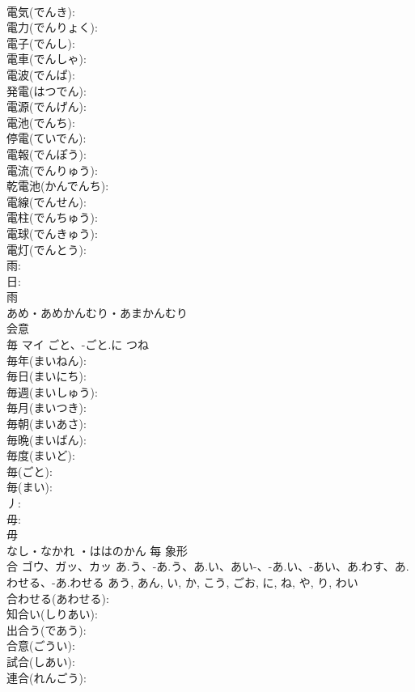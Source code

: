 \documentclass[8pt]{extreport}
\begin{document}
\begin{CJK}{UTF8}{min}
\\	電気(でんき): 
\\	電力(でんりょく): 
\\	電子(でんし): 
\\	電車(でんしゃ): 
\\	電波(でんぱ): 
\\	発電(はつでん): 
\\	電源(でんげん): 
\\	電池(でんち): 
\\	停電(ていでん): 
\\	電報(でんぽう): 
\\	電流(でんりゅう): 
\\	乾電池(かんでんち): 
\\	電線(でんせん): 
\\	電柱(でんちゅう): 
\\	電球(でんきゅう): 
\\	電灯(でんとう): 
\\	雨: 
\\	日: 
\\	雨	
\\	あめ・あめかんむり・あまかんむり	
\\	会意 
\\	毎	マイ	ごと、-ごと.に	つね	
\\	毎年(まいねん): 
\\	毎日(まいにち): 
\\	毎週(まいしゅう): 
\\	毎月(まいつき): 
\\	毎朝(まいあさ): 
\\	毎晩(まいばん): 
\\	毎度(まいど): 
\\	毎(ごと): 
\\	毎(まい): 
\\	丿: 
\\	毋: 
\\	毋	
\\	なし・なかれ ・ははのかん	每	象形 
\\	合	ゴウ、ガッ、カッ	あ.う、-あ.う、あ.い、あい-、-あ.い、-あい、あ.わす、あ.わせる、-あ.わせる	あう, あん, い, か, こう, ごお, に, ね, や, り, わい	
\\	合わせる(あわせる): 
\\	知合い(しりあい): 
\\	出合う(であう): 
\\	合意(ごうい): 
\\	試合(しあい): 
\\	連合(れんごう): 

\end{CJK}
\end{document}
